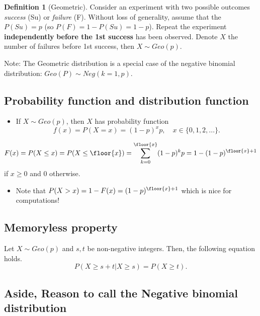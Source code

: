 \documentclass[
]{book}
\providecommand{\tightlist}{%
  \setlength{\itemsep}{0pt}\setlength{\parskip}{0pt}}
\theoremstyle{definition}
\newtheorem{definition}{Definition}[chapter]
\theoremstyle{definition}
\theoremstyle{definition}
\theoremstyle{definition}
\theoremstyle{remark}
\begin{document}
\begin{definition}[Geometric]
Consider an experiment with two possible outcomes \emph{success} (Su) or \emph{failure} (F). Without loss of generality, assume that the \(P(Su)=p\) (so \(P(F)=1-P(Su)= 1-p\)). Repeat the experiment \textbf{independently} \textbf{before the 1st success} has been observed. Denote \(X\) the number of failures before 1st success, then \(X\sim Geo(p)\).
\end{definition}

Note: The Geometric distribution is a special case of the negative binomial distribution: \(Geo(P) \sim Neg(k=1,p)\).

\hypertarget{probability-function-and-distribution-function-1}{%
\subsection{Probability function and distribution function}\label{probability-function-and-distribution-function-1}}

\begin{itemize}
\tightlist
\item
  If \(X\sim Geo(p)\), then \(X\) has probability function
  \[ f(x) = P(X=x)= (1-p)^x p,\quad x\in\{0,1,2,\dots\}.\]
\end{itemize}

\[ F(x)=P(X\leq x) 
= P(X\leq \floor{x}) = 
\sum_{k=0}^{\floor{x}} (1-p)^k p =
1-(1-p)^{\floor{x}+1}\]
if \(x\geq 0\) and \(0\) otherwise.

\begin{itemize}
\tightlist
\item
  Note that \(P(X>x)=1-F(x)=(1-p)^{\floor{x}+1}\) which is nice for computations!
\end{itemize}

\hypertarget{memoryless-property}{%
\subsection{Memoryless property}\label{memoryless-property}}

Let \(X \sim Geo(p)\) and \(s,t\) be non-negative integers. Then, the following equation holds.
\[
P(X \geq s+t | X \geq s) = P(X \geq t).
\]

\hypertarget{aside-reason-to-call-the-negative-binomial-distribution}{%
\subsection{Aside, Reason to call the Negative binomial distribution}\label{aside-reason-to-call-the-negative-binomial-distribution}}
\end{document}
